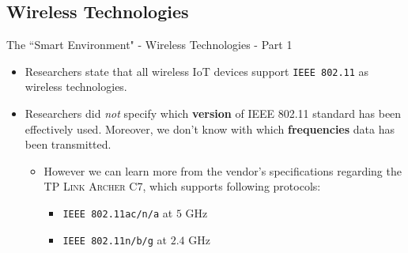 \documentclass[10pt]{beamer}
\begin{document}
\subsection{Wireless Technologies}
\begin{frame}{The ``Smart Environment" - Wireless Technologies - Part 1}

\begin{itemize}
\justifying
\item Researchers state that all wireless IoT devices support \texttt{IEEE 802.11} as wireless technologies.

\item Researchers did \textit{not} specify which \textbf{version} of IEEE 802.11 standard has been effectively used. Moreover, we don't know with which \textbf{frequencies} data has been transmitted.

\begin{itemize}
\justifying
\item However we can learn more from the vendor's specifications regarding the \textsc{TP Link Archer C7}, which supports following protocols:

\begin{itemize}
\item \texttt{IEEE 802.11ac/n/a} at $5$ GHz
\item \texttt{IEEE 802.11n/b/g} at $2.4$ GHz
\end{itemize}
\end{itemize}

\end{itemize}

\end{frame} 
\end{document}

